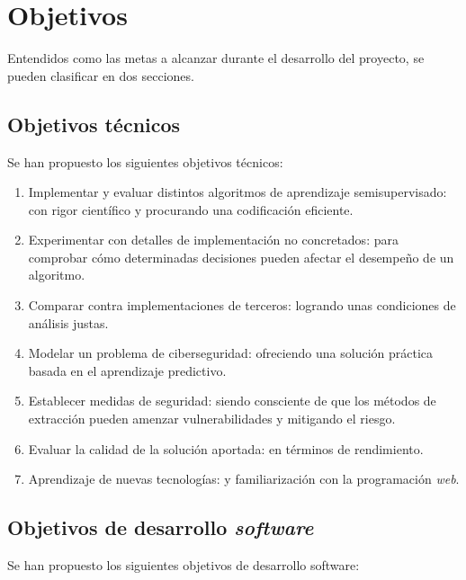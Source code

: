 \section{Objetivos}

Entendidos como las metas a alcanzar durante el desarrollo del proyecto, se pueden clasificar en dos secciones.

\subsection{Objetivos técnicos}
\label{Objetivos técnicos}

Se han propuesto los siguientes objetivos técnicos:

\begin{enumerate}
	\item Implementar y evaluar distintos algoritmos de aprendizaje semisupervisado: con rigor científico y procurando una codificación eficiente.
	\item Experimentar con detalles de implementación no concretados: para comprobar cómo determinadas decisiones pueden afectar el desempeño de un algoritmo.
	\item Comparar contra implementaciones de terceros: logrando unas condiciones de análisis justas.
	\item Modelar un problema de ciberseguridad: ofreciendo una solución práctica basada en el aprendizaje predictivo.
	\item Establecer medidas de seguridad: siendo consciente de que los métodos de extracción pueden amenzar vulnerabilidades y mitigando el riesgo.
	\item Evaluar la calidad de la solución aportada: en términos de rendimiento.
	\item Aprendizaje de nuevas tecnologías: y familiarización con la programación \textit{web}.
	
\end{enumerate}

\subsection{Objetivos de desarrollo \textit{software}}
\label{Objetivos de desarrollo}

Se han propuesto los siguientes objetivos de desarrollo software:

